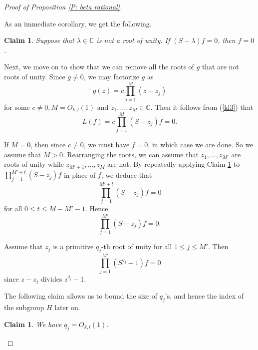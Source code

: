 \documentclass[11pt]{amsart}
\newtheorem{claim}[lemma]{Claim}
\theoremstyle{definition}
\newcommand{\1}{{\mathbf{1}}}
\begin{document}
\begin{proof}[Proof of Proposition \ref{P: beta rational}]
\

As an immediate corollary, we get the following.

\begin{claim}\label{Claim 2}
   Suppose that $\lambda\in\mathbb{C}$ is not a root of unity. If $(S-\lambda)f=0$, then $f=0$.
\end{claim}






 Next, we move on to show that we can remove all the roots of $g$ that are not roots of unity. Since $g\neq 0$, we may factorize $g$ as 
 $$g(z)=c\prod_{j=1}^{M}(z-z_{j})$$
 for some $c\neq 0, M=O_{k,l}(1)$ and $z_{1},\dots,z_{M}\in\mathbb{C}$. Then it follows from (\ref{kl3}) that
 $$L(f)=c\prod_{j=1}^{M}(S-z_{j})f=0.$$

If $M=0$, then since $c\neq 0$, we must have $f=0$, in which case we are done. So we assume that $M>0$. Rearranging the roots, we can assume that  $z_{1},\dots,z_{M'}$ are roots of unity while $z_{M'+1},\dots,z_{M}$ are not. By repeatedly applying Claim \ref{Claim 2} to $\prod_{j=1}^{M'+t}(S-z_{j})f$ in place of $f$, we deduce that
$$\prod_{j=1}^{M'+t}(S-z_{j})f=0$$
for all $0\leq t\leq M-M'-1$. Hence
 $$\prod_{j=1}^{M'}(S-z_{j})f=0.$$
 
 Assume that $z_j$ is a primitive $q_j$-th root of unity for all $1\leq j\leq M'$.
Then  
\begin{equation}\label{kl5}
    \prod_{j=1}^{M'}(S^{q_{j}}-1)f=0
\end{equation}
since $z-z_{j}$ divides $z^{q_{j}}-1$.

The following claim allows us to bound the size of $q_j$'s, and hence the index of the subgroup $H$ later on.
\begin{claim}\label{Claim 3}
    We have $q_{j}=O_{k,l}(1)$.
\end{claim}
 

\end{proof}
\end{document}
